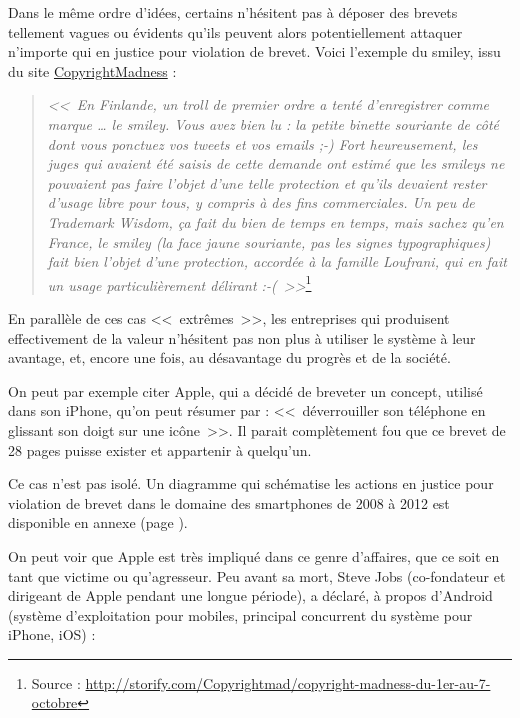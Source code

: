 Dans le même ordre d'idées, certains n'hésitent pas à déposer des brevets tellement vagues ou évidents qu'ils peuvent alors potentiellement attaquer n'importe qui en justice pour violation de brevet.
Voici l'exemple du smiley, issu du site \href{http://copyrightmadness.tumblr.com/}{CopyrightMadness} :

\begin{quotation}
\begin{flushright}
\textit{<<~En Finlande, un troll de premier ordre a tenté d'enregistrer comme marque \dots{} le smiley.
Vous avez bien lu : la petite binette souriante de côté dont vous ponctuez vos tweets et vos emails ;-)
Fort heureusement, les juges qui avaient été saisis de cette demande ont estimé que les smileys ne pouvaient pas faire l'objet d'une telle protection et qu'ils devaient rester d'usage libre pour tous, y compris à des fins commerciales.
Un peu de Trademark Wisdom, ça fait du bien de temps en temps, mais sachez qu'en France, le smiley (la face jaune souriante, pas les signes typographiques) fait bien l'objet d'une protection, accordée à la famille Loufrani, qui en fait un usage particulièrement délirant :-(~>>}\footnote{Source : \url{http://storify.com/Copyrightmad/copyright-madness-du-1er-au-7-octobre}}
\end{flushright}
\end{quotation}

En parallèle de ces cas <<~extrêmes~>>, les entreprises qui produisent effectivement de la valeur n'hésitent pas non plus à utiliser le système à leur avantage, et, encore une fois, au désavantage du progrès et de la société.

On peut par exemple citer Apple, qui a décidé de breveter un concept, utilisé dans son iPhone, qu'on peut résumer par : <<~déverrouiller son téléphone en glissant son doigt sur une icône~>>.
Il parait complètement fou que ce brevet de 28 pages puisse exister et appartenir à quelqu'un.

Ce cas n'est pas isolé.
Un diagramme qui schématise les actions en justice pour violation de brevet dans le domaine des smartphones de 2008 à 2012 est disponible en annexe (page \pageref{annexe-smartphones}).

On peut voir que Apple est très impliqué dans ce genre d'affaires, que ce soit en tant que victime ou qu'agresseur.
Peu avant sa mort, Steve Jobs (co-fondateur et dirigeant de Apple pendant une longue période), a déclaré, à propos d'Android (système d'exploitation pour mobiles, principal concurrent du système pour iPhone, iOS) :

